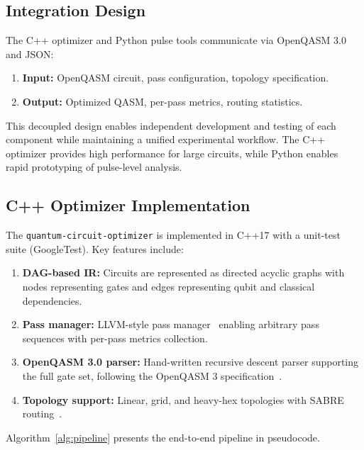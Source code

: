 \documentclass[sigconf,nonacm]{acmart}
\begin{document}
\subsection{Integration Design}

The C++ optimizer and Python pulse tools communicate via OpenQASM 3.0 and JSON:
\begin{enumerate}
    \item \textbf{Input:} OpenQASM circuit, pass configuration, topology specification.
    \item \textbf{Output:} Optimized QASM, per-pass metrics, routing statistics.
\end{enumerate}

This decoupled design enables independent development and testing of each component while maintaining a unified experimental workflow. The C++ optimizer provides high performance for large circuits, while Python enables rapid prototyping of pulse-level analysis.

\subsection{C++ Optimizer Implementation}

The \texttt{quantum-circuit-optimizer} is implemented in C++17 with a unit-test suite (GoogleTest). Key features include:

\begin{enumerate}
    \item \textbf{DAG-based IR:} Circuits are represented as directed acyclic graphs with nodes representing gates and edges representing qubit and classical dependencies.
    \item \textbf{Pass manager:} LLVM-style pass manager~\cite{lattner2004llvm} enabling arbitrary pass sequences with per-pass metrics collection.
    \item \textbf{OpenQASM 3.0 parser:} Hand-written recursive descent parser supporting the full gate set, following the OpenQASM 3 specification~\cite{cross2022openqasm3}.
    \item \textbf{Topology support:} Linear, grid, and heavy-hex topologies with SABRE routing~\cite{li2019tackling}.
\end{enumerate}

Algorithm~\ref{alg:pipeline} presents the end-to-end pipeline in pseudocode.
\end{document}
